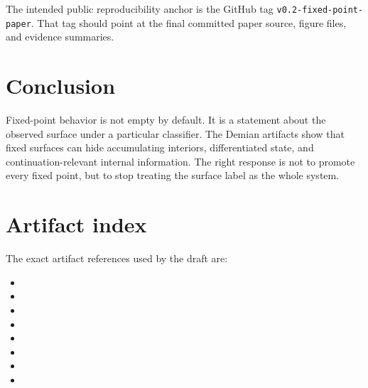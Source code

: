 \documentclass[11pt]{article}
\begin{document}
The intended public reproducibility anchor is the GitHub tag
\texttt{v0.2-fixed-point-paper}. That tag should point at the final committed
paper source, figure files, and evidence summaries.

\section{Conclusion}

Fixed-point behavior is not empty by default. It is a statement about the
observed surface under a particular classifier. The Demian artifacts show that
fixed surfaces can hide accumulating interiors, differentiated state, and
continuation-relevant internal information. The right response is not to
promote every fixed point, but to stop treating the surface label as the whole
system.

\appendix

\section{Artifact index}

\begin{sloppypar}
\small
The exact artifact references used by the draft are:

\begin{itemize}
  \item {}
  \item {}
  \item {}
  \item {}
  \item {}
  \item {}
  \item {}
  \item {}
\end{itemize}
\end{sloppypar}



\end{document}
